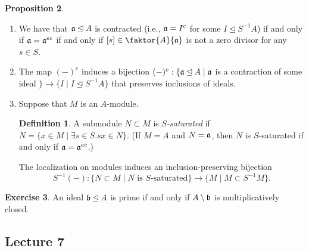 \documentclass[10pt,letterpaper,cm]{nupset}
\theoremstyle{definition}
\newtheorem{definition}{Definition}[subsection]
\theoremstyle{theorem}
\newtheorem{prop}[definition]{Proposition}
\newtheorem{exercise}[definition]{Exercise}
\theoremstyle{remark}
\newcommand{\1}{\mathbf{1}}
\newcommand{\0}{\vec 0}
\begin{document}
\begin{prop}
\begin{enumerate}
\begin{proof}
\end{proof}
\item We have that $\frak{a} \unlhd A$ is contracted (i.e., $\frak{a} = I^c$ for some $I \unlhd S^{-1}A$) if and only if $\frak{a} = \frak{a}^{ec}$ if and only if $[s] \in \faktor{A}{\frak{a}}$ is not a zero divisor for any $s\in S$.
\item The map $(-)^e$ induces a bijection $(-)^e : \{\frak{a} \unlhd A \mid \frak{a}$ is a contraction of some ideal $\} \to \{I \mid I \unlhd S^{-1}A\}$ that preserves inclusions of ideals.
\item Suppose that $M$ is an $A$-module. 
\begin{definition}
A submodule $N \subset M$ is \textit{$S$-saturated} if $N= \{x \in M \mid \exists s \in S. sx\in N\}$. (If $M=A$ and $N= \frak{a}$, then $N$ is $S$-saturated if and only if $\frak{a} = \frak{a}^{ec}$.)
\end{definition} 
The localization on modules induces an inclusion-preserving bijection $$S^{-1}(-) : \{N \subset M \mid N \text{ is } S\text{-saturated}\} \to \{M \mid M \subset S^{-1}M\}.$$
\end{enumerate}
\end{prop}

\begin{exercise}
An ideal $\frak{b} \unlhd A$ is prime if and only if $A \setminus \frak{b}$ is multiplicatively closed. 
\end{exercise}

\subsection{Lecture 7}
\end{document}
